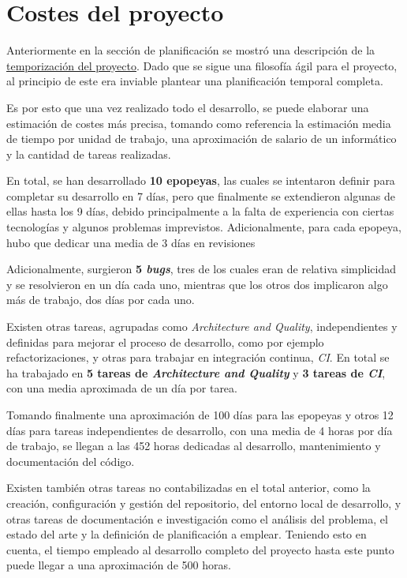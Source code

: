 \chapter{Costes del proyecto}

Anteriormente en la sección de planificación se mostró una descripción de la \hyperref[Temporizacion]{\underline{temporización del proyecto}}. Dado que se sigue una filosofía ágil para el proyecto, al principio de este era inviable plantear una planificación temporal completa.

Es por esto que una vez realizado todo el desarrollo, se puede elaborar una estimación de costes más precisa, tomando como referencia la estimación media de tiempo por unidad de trabajo, una aproximación de salario de un informático y la cantidad de tareas realizadas.

En total, se han desarrollado \textbf{10 epopeyas}, las cuales se intentaron definir para completar su desarrollo en 7 días, pero que finalmente se extendieron algunas de ellas hasta los 9 días, debido principalmente a la falta de experiencia con ciertas tecnologías y algunos problemas imprevistos. Adicionalmente, para cada epopeya, hubo que dedicar una media de 3 días en revisiones

Adicionalmente, surgieron \textbf{5 \textit{bugs}}, tres de los cuales eran de relativa simplicidad y se resolvieron en un día cada uno, mientras que los otros dos implicaron algo más de trabajo, dos días por cada uno.

Existen otras tareas, agrupadas como \textit{Architecture and Quality}, independientes y definidas para mejorar el proceso de desarrollo, como por ejemplo refactorizaciones, y otras para trabajar en integración continua, \textit{CI}. En total se ha trabajado en \textbf{5 tareas de \textit{Architecture and Quality}} y \textbf{3 tareas de \textit{CI}}, con una media aproximada de un día por tarea.

Tomando finalmente una aproximación de 100 días para las epopeyas y otros 12 días para tareas independientes de desarrollo, con una media de 4 horas por día de trabajo, se llegan a las 452 horas dedicadas al desarrollo, mantenimiento y documentación del código.

Existen también otras tareas no contabilizadas en el total anterior, como la creación, configuración y gestión del repositorio, del entorno local de desarrollo, y otras tareas de documentación e investigación como el análisis del problema, el estado del arte y la definición de planificación a emplear. Teniendo esto en cuenta, el tiempo empleado al desarrollo completo del proyecto hasta este punto puede llegar a una aproximación de 500 horas.

